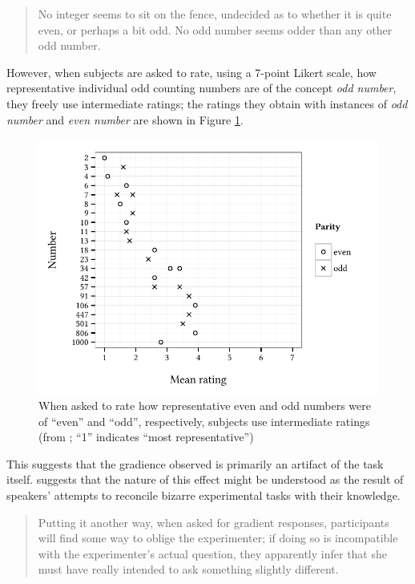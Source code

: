 \begin{quote}
No integer seems to sit on the fence, undecided as to whether it is quite even, or perhaps a bit odd. No odd number seems odder than any other odd number. \citep[274]{Armstrong1983}
\end{quote}

\noindent
However, when subjects are asked to rate, using a 7-point Likert scale, how representative individual odd counting numbers are of the concept \emph{odd number}, they freely use intermediate ratings; the ratings they obtain with instances of \emph{odd number} and \emph{even number} are shown in Figure \ref{agg}.

\begin{figure}[t]
\centering
\includegraphics{agg.pdf}
\caption{When asked to rate how representative even and odd numbers were of ``even'' and ``odd'', respectively, subjects use intermediate ratings (from \citealp{Armstrong1983}; ``1'' indicates ``most representative'')}
\label{agg}
\end{figure}

This suggests that the gradience observed is primarily an artifact of the task itself. 
\citeauthor{Schutze2011} suggests that the nature of this effect might be understood as the result of speakers' attempts to reconcile bizarre experimental tasks with their knowledge.

\begin{quote}
Putting it another way, when asked for gradient responses, participants will find some way to oblige the experimenter; if doing so is incompatible with the experimenter's actual question, they apparently infer that she must have really intended to ask something slightly different. \citep[24]{Schutze2011}
\end{quote}

